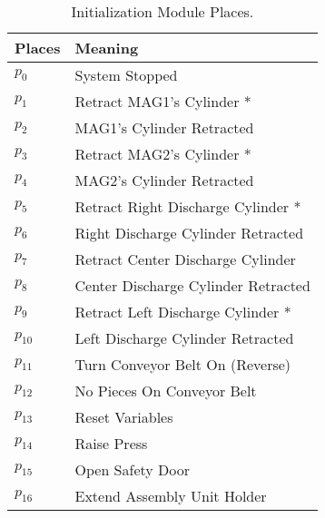 \begin{table}[htbp]
\caption{Initialization Module Places.}
\centering
\begin{tabular}{M{5cm}M{10cm}}
Places & Meaning\\
\hline
\hyperlink{partialNet:p0m1}{\hypertarget{partialTable:p0m1}{$p_{0}$}} & System Stopped\\
\hyperlink{partialNet:p1}{\hypertarget{partialTable:p1}{$p_{1}$}} & Retract MAG1's Cylinder *\\
\hyperlink{partialNet:p2}{\hypertarget{partialTable:p2}{$p_{2}$}} & MAG1's Cylinder Retracted\\
\hyperlink{partialNet:p3}{\hypertarget{partialTable:p3}{$p_{3}$}} & Retract MAG2's Cylinder *\\
\hyperlink{partialNet:p4}{\hypertarget{partialTable:p4}{$p_{4}$}} & MAG2's Cylinder Retracted\\
\hyperlink{partialNet:p5}{\hypertarget{partialTable:p5}{$p_{5}$}} & Retract Right Discharge Cylinder *\\
\hyperlink{partialNet:p6}{\hypertarget{partialTable:p6}{$p_{6}$}} & Right Discharge Cylinder Retracted\\
\hyperlink{partialNet:p7}{\hypertarget{partialTable:p7}{$p_{7}$}} & Retract Center Discharge Cylinder\\
\hyperlink{partialNet:p8}{\hypertarget{partialTable:p8}{$p_{8}$}} & Center Discharge Cylinder Retracted\\
\hyperlink{partialNet:p9}{\hypertarget{partialTable:p9}{$p_{9}$}} & Retract Left Discharge Cylinder *\\
\hyperlink{partialNet:p10}{\hypertarget{partialTable:p10}{$p_{10}$}} & Left Discharge Cylinder Retracted\\
\hyperlink{partialNet:p11}{\hypertarget{partialTable:p11}{$p_{11}$}} & Turn Conveyor Belt On (Reverse)\\
\hyperlink{partialNet:p12}{\hypertarget{partialTable:p12}{$p_{12}$}} & No Pieces On Conveyor Belt\\
\hyperlink{partialNet:p13}{\hypertarget{partialTable:p13}{$p_{13}$}} & Reset Variables\\
\hyperlink{partialNet:p14}{\hypertarget{partialTable:p14}{$p_{14}$}} & Raise Press\\
\hyperlink{partialNet:p15}{\hypertarget{partialTable:p15}{$p_{15}$}} & Open Safety Door\\
\hyperlink{partialNet:p16}{\hypertarget{partialTable:p16}{$p_{16}$}} & Extend Assembly Unit Holder\\

\end{tabular}
\end{table}
